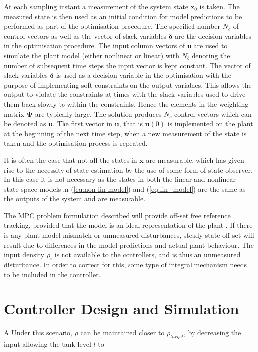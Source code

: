 \documentclass[preprint,authoryear,12pt]{elsarticle}
\begin{document}
At each sampling instant a measurement of the system state $\mathbf{x}_0$ is taken. The measured state is then used as an initial condition for model predictions to be performed as part of the optimisation procedure. The specified number $N_c$ of control vectors as well as the vector of slack variables $\boldsymbol{\delta}$ are the decision variables in the optimisation procedure. The input column vectors of $\mathbf{u}$ are used to simulate the plant model (either nonlinear or linear) with $N_b$ denoting the number of subsequent time steps the input vector is kept constant. The vector of slack variables $\boldsymbol{\delta}$ is used as a decision variable in the optimisation with the purpose of implementing soft constraints on the output variables. This allows the output to violate the constraints at times with the slack variables used to drive them back slowly to within the constraints. Hence the elements in the weighting matrix $\boldsymbol{\Psi}$ are typically large. The solution produces $N_c$ control vectors which can be denoted as $\tilde{\mathbf{u}}$. The first vector in $\tilde{\mathbf{u}}$, that is $\tilde{\mathbf{u}}(0)$ is implemented on the plant at the beginning of the next time step, when a new measurement of the state is taken and the optimisation process is repeated.

It is often the case that not all the states in $\mathbf{x}$ are measurable, which has given rise to the necessity of state estimation by the use of some form of state observer. In this case it is not necessary as the states in both the linear and nonlinear state-space models in (\ref{eq:non-lin model}) and (\ref{eq:lin_model}) are the same as the outputs of the system and are measurable. 

The MPC problem formulation described will provide off-set free reference tracking, provided that the model is an ideal representation of the plant \citep{Mayne2009}. If there is any plant model mismatch or unmeasured disturbances, steady state off-set will result due to differences in the model predictions and actual plant behaviour. The input density $\rho_i$ is not available to the controllers, and is thus an unmeasured disturbance. In order to correct for this, some type of integral mechanism needs to be included in the controller.


\section{Controller Design and Simulation}\label{sec:ControllerDesignAndSimulation}
A Under this scenario, $\rho$ can be maintained closer to $\rho_{target}$, by decreasing the input allowing the tank level $l$ to 
\end{document}
